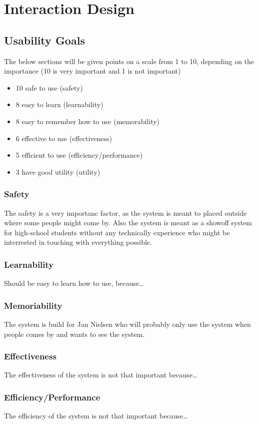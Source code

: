 \section{Interaction Design}
\subsection{Usability Goals}
The below sections will be given points on a scale from 1 to 10, depending on
the importance (10 is very important and 1 is not important)
\begin{itemize}
	\item 10 safe to use (safety)
	\item 8 easy to learn (learnability) 
	\item 8 easy to remember how to use (memorability)
	\item 6 effective to use (effectiveness) 
	\item 5 efficient to use (efficiency/performance)
	\item 3 have good utility (utility)	
\end{itemize}
\subsubsection{Safety}
The safety is a very importanc factor, as the system is meant to placed outside
where some people might come by. Also the system is meant as a showoff system
for high-school students without any technically experience who might be
interrested in touching with everything possible.
\subsubsection{Learnability}
Should be easy to learn how to use, because\ldots
\subsubsection{Memoriability}
The system is build for Jan Nielsen who will probably only use the system when
people comes by and wants to see the system.
\subsubsection{Effectiveness}
The effectiveness of the system is not that important because\ldots
\subsubsection{Efficiency/Performance}
The efficiency of the system is not that important because\ldots
